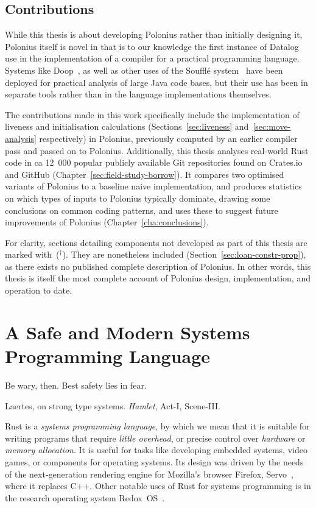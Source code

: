 \documentclass[11pt,a4paper,twoside,openany,draft]{report}
\newcommand{\notmine}[0] {$^\dagger$}
\begin{document}
\section{Contributions}\label{sec:contributions}

While this thesis is about developing Polonius rather than initially designing
it, Polonius itself is novel in that is to our knowledge the first instance of
Datalog use in the implementation of a compiler for a practical programming
language. Systems like Doop~\cite{bravenboer_strictly_2009}, as well as other
uses of the Souffl{\'e} system~\cite{souffle} have been deployed for practical
analysis of large Java code bases, but their use has been in separate tools
rather than in the language implementations themselves.

The contributions made in this work specifically include the implementation of
liveness and initialisation calculations (Sections~\ref{sec:liveness}
and~\ref{sec:move-analysis} respectively) in Polonius, previously computed by an
earlier compiler pass and passed on to Polonius. Additionally, this thesis
analyses real-world Rust code in ca 12~000 popular publicly available Git
repositories found on Crates.io and GitHub
(Chapter~\ref{sec:field-study-borrow}). It compares two optimised variants of
Polonius to a baseline naive implementation, and produces statistics on which
types of inputs to Polonius typically dominate, drawing some conclusions on
common coding patterns, and uses these to suggest future improvements of
Polonius (Chapter~\ref{cha:conclusions}).

For clarity, sections detailing components not developed as part of this thesis
are marked with~(\notmine{}). They are nonetheless included
(Section~\ref{sec:loan-constr-prop}), as there exists no published complete
description of Polonius. In other words, this thesis is itself the most complete
account of Polonius design, implementation, and operation to date.

\chapter{A Safe and Modern Systems Programming Language}\label{cha:background}
\epigraph{Be wary, then. Best safety lies in fear.}%
{Laertes, on strong type systems. \textit{Hamlet}, Act-I, Scene-III.}

Rust is a \textit{systems programming language}, by which we mean that it is
suitable for writing programs that require \textit{little overhead}, or precise
control over \textit{hardware} or \textit{memory allocation}. It is useful for
tasks like developing embedded systems, video games, or components for operating
systems. Its design was driven by the needs of the next-generation rendering
engine for Mozilla's browser Firefox, Servo~\cite{anderson2016engineering},
where it replaces C++. Other notable uses of Rust for systems programming is in
the research operating system Redox~OS~\cite{redox}.
\end{document}
